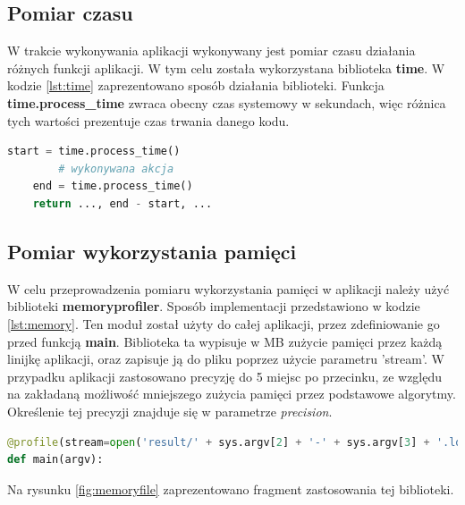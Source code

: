 \subsection{Pomiar czasu}
\label{ssec:timemethod}
W trakcie wykonywania aplikacji wykonywany jest pomiar czasu działania różnych funkcji aplikacji. W tym celu została wykorzystana biblioteka \textbf{time}. W kodzie \ref{lst:time} zaprezentowano sposób działania biblioteki. Funkcja \textbf{time.process\_time} zwraca obecny czas systemowy w sekundach, więc różnica tych wartości prezentuje czas trwania danego kodu.
\begin{lstlisting}[language=Python, caption=Pomiar czasu, label={lst:time}]
    start = time.process_time()
        # wykonywana akcja
    end = time.process_time()
    return ..., end - start, ...
\end{lstlisting}
\subsection{Pomiar wykorzystania pamięci}
\label{ssec:memorymethod}
W celu przeprowadzenia pomiaru wykorzystania pamięci w aplikacji należy użyć biblioteki \textbf{memory\-profiler}. Sposób implementacji przedstawiono w kodzie \ref{lst:memory}. Ten moduł został użyty do całej aplikacji, przez zdefiniowanie go przed funkcją \textbf{main}. Biblioteka ta wypisuje w MB zużycie pamięci przez każdą linijkę aplikacji, oraz zapisuje ją do pliku poprzez użycie parametru 'stream'. W przypadku aplikacji zastosowano precyzję do 5 miejsc po przecinku, ze względu na zakładaną możliwość mniejszego zużycia pamięci przez podstawowe algorytmy. Określenie tej precyzji znajduje się w parametrze \emph{precision}.
\begin{lstlisting}[language=Python, caption=Pomiar wykorzystania pamięci, label={lst:memory}]
@profile(stream=open('result/' + sys.argv[2] + '-' + sys.argv[3] + '.log','w+'), precision=4)
def main(argv):
\end{lstlisting}
Na rysunku \ref{fig:memoryfile} zaprezentowano fragment zastosowania tej biblioteki.
